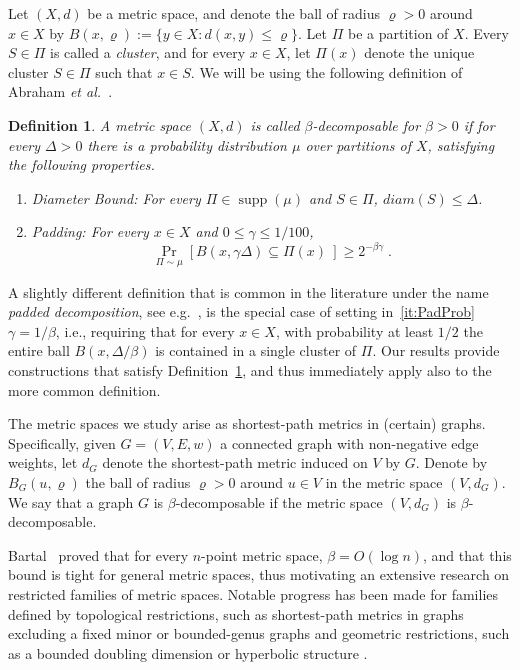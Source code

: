 \documentclass[11pt,fleqn]{article}
\newtheorem{definition}[theorem]{Definition}
\DeclareMathOperator{\supp}{supp}
\newcommand{\etal}{{\em et al.\ }\xspace}
\providecommand{\eqdef}{:=}
\begin{document}
Let $(X,d)$ be a metric space,
and denote the ball of radius $\varrho>0$ around $x\in X$ by $B(x,\varrho) \eqdef \{y \in X : d(x,y) \le \varrho\}$. 
Let $\Pi$ be a partition of $X$. Every $S \in \Pi$ is called a {\em cluster},
and for every $x\in X$, let $\Pi(x)$ denote the unique cluster 
$S \in \Pi$ such that $x \in S$.
We will be using the following definition of Abraham \etal \cite{AGGNT14}.

\begin{definition}\label{def:beta} 
A metric space $(X,d)$ is called {\em $\beta$-decomposable} for $\beta >0$ if for every $\Delta>0$ there is a probability distribution $\mu$ over partitions of $X$, satisfying the following properties.
\begin{enumerate}
\renewcommand{\theenumi}{(\alph{enumi})}
	\item \label{it:DiameterBound}
	Diameter Bound: For every $\Pi \in \supp(\mu)$ and $S \in \Pi$, $diam(S) \le \Delta$.
	\item \label{it:PadProb}
	Padding: For every $x \in X$ and $0 \le \gamma \le 1/100$, $$\Pr_{\Pi \sim \mu}[B(x,\gamma \Delta) \subseteq \Pi(x) \ ] \ge 2^{- \beta \gamma} \; .$$
\end{enumerate}
\end{definition}

A slightly different definition that is common in the literature 
under the name {\em padded decomposition}, see e.g.\ \cite{KLMN05,LN2004}, 
is the special case of setting in~\ref{it:PadProb} $\gamma=1/\beta$,
i.e., requiring that for every $x \in X$, with probability at least $1/2$ 
the entire ball $B(x,\Delta/\beta)$ is contained in a single cluster of $\Pi$.
Our results provide constructions that satisfy Definition~\ref{def:beta}, 
and thus immediately apply also to the more common definition.

The metric spaces we study arise as shortest-path metrics in (certain) graphs. 
Specifically, given $G = (V,E,w)$ 
a connected graph with non-negative edge weights, let $d_G$ denote the shortest-path metric induced on $V$ by $G$. Denote by $B_G(u,\varrho)$ the ball of radius $\varrho>0$ around $u \in V$ in the metric space $(V,d_G)$.
We say that a graph $G$ is $\beta$-decomposable if the metric space $(V,d_G)$ is $\beta$-decomposable.

Bartal~\cite{Bartal96} proved that for every $n$-point metric space, $\beta = O(\log n)$, and that this bound is tight for general metric spaces, thus motivating an extensive research on restricted families of metric spaces. 
Notable progress has been made for families defined by topological restrictions, such as shortest-path metrics in graphs excluding a fixed minor \cite{KPR93,FT03,AGGNT14} or bounded-genus graphs \cite{LS10,AGGNT14} and geometric restrictions, such as a bounded doubling dimension \cite{GKL03} or hyperbolic structure \cite{KL06}.
\end{document}
